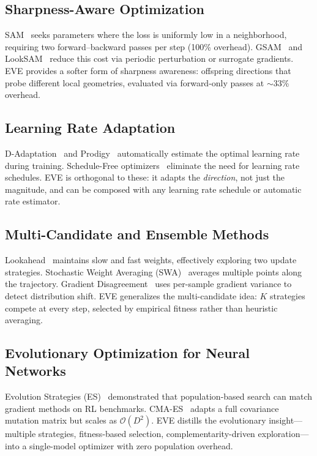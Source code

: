 \documentclass[12pt]{article}
\begin{document}
\subsection{Sharpness-Aware Optimization}

SAM~\cite{foret2021sharpnessaware} seeks parameters where the loss is
uniformly low in a neighborhood, requiring two forward--backward passes
per step (100\% overhead).
GSAM~\cite{zhuang2022surrogate} and LookSAM~\cite{liu2022towards}
reduce this cost via periodic perturbation or surrogate gradients.
EVE provides a softer form of sharpness awareness: offspring directions
that probe different local geometries, evaluated via forward-only passes
at $\sim$33\% overhead.

\subsection{Learning Rate Adaptation}

D-Adaptation~\cite{defazio2023dadaptation} and Prodigy~\cite{mishchenko2024prodigy}
automatically estimate the optimal learning rate during training.
Schedule-Free optimizers~\cite{defazio2024schedulefree} eliminate the
need for learning rate schedules.
EVE is orthogonal to these: it adapts the \emph{direction}, not just
the magnitude, and can be composed with any learning rate schedule or
automatic rate estimator.

\subsection{Multi-Candidate and Ensemble Methods}

Lookahead~\cite{zhang2019lookahead} maintains slow and fast weights,
effectively exploring two update strategies.
Stochastic Weight Averaging (SWA)~\cite{izmailov2018averaging} averages
multiple points along the trajectory.
Gradient Disagreement~\cite{mansilla2021domain} uses per-sample gradient
variance to detect distribution shift.
EVE generalizes the multi-candidate idea: $K$ strategies compete at
every step, selected by empirical fitness rather than heuristic averaging.

\subsection{Evolutionary Optimization for Neural Networks}

Evolution Strategies (ES)~\cite{salimans2017evolution} demonstrated that
population-based search can match gradient methods on RL benchmarks.
CMA-ES~\cite{hansen2001cma} adapts a full covariance mutation matrix
but scales as $\mathcal{O}(D^2)$.
EVE distills the evolutionary insight---multiple strategies, fitness-based
selection, complementarity-driven exploration---into a single-model
optimizer with zero population overhead.
\end{document}
